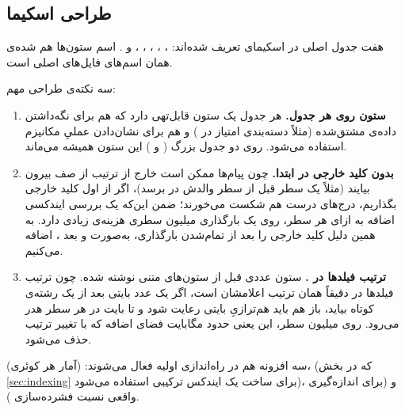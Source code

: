 \subsection{طراحی اسکیما}

هفت جدول اصلی  در اسکیمای  تعریف شده‌اند: ، ، ، ، ،  و . اسم ستون‌ها هم  شده‌ی همان اسم‌های  فایل‌های اصلی  است.

سه نکته‌ی طراحی مهم:

\begin{enumerate}
\item \textbf{ستون  روی هر جدول.} هر جدول یک ستون  قابل‌تهی دارد که هم برای نگه‌داشتن داده‌ی مشتق‌شده (مثلاً دسته‌بندی امتیاز در ) و هم برای نشان‌دادن عملیِ مکانیزم  استفاده می‌شود. روی دو جدول بزرگ ( و ) این ستون همیشه  می‌ماند.

\item \textbf{بدون کلید خارجی در ابتدا.} چون پیام‌ها ممکن است خارج از ترتیب از صف بیرون بیایند (مثلاً یک سطر  قبل از سطر والدش در  برسد)، اگر از اول کلید خارجی بگذاریم، درج‌های درست هم شکست می‌خورند؛ ضمن این‌که یک بررسی ایندکسی اضافه به ازای هر سطر، روی یک بارگذاری  میلیون سطری هزینه‌ی زیادی دارد. به همین دلیل کلید خارجی را بعد از تمام‌شدن بارگذاری، به‌صورت  و بعد ، اضافه می‌کنیم.

\item \textbf{ترتیب فیلدها در .} ستون عددی  قبل از ستون‌های متنی نوشته شده. چون ترتیب فیلدها در  دقیقاً همان ترتیب اعلامشان است، اگر یک عدد بایتی بعد از یک رشته‌ی کوتاه بیاید، باز هم باید هم‌ترازیِ بایتی رعایت شود و تا  بایت در هر سطر هدر می‌رود. روی  میلیون سطر، این یعنی حدود  مگابایت فضای اضافه که با تغییر ترتیب حذف می‌شود.
\end{enumerate}

سه افزونه هم در راه‌اندازی اولیه فعال می‌شوند:  (آمار هر کوئری)،  (که در بخش \ref{sec:indexing} برای ساخت یک ایندکس  ترکیبی استفاده می‌شود)، و  (برای اندازه‌گیری واقعی نسبت فشرده‌سازی ).
